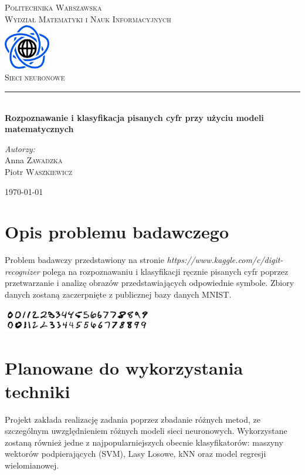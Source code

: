 \documentclass{article}
\begin{document}
\begin{titlepage}
\newcommand{\HRule}{\rule{\linewidth}{0.5mm}}
\begin{center}
\textsc{\LARGE Politechnika Warszawska}\\[0.5cm]
\textsc{\Large Wydział Matematyki i Nauk Informacyjnych}\\[1cm]
\includegraphics[width=2cm, height=2cm]{logo}\\[1cm]
\textsc{\Huge Sieci neuronowe}\\[0.5cm]
\HRule \\[0.4cm]
{ \LARGE \bfseries Rozpoznawanie i klasyfikacja pisanych cyfr przy użyciu modeli matematycznych}\\[4cm]
\begin{flushright}
\Large \emph{Autorzy:}\\[0.5cm]
Anna \textsc{Zawadzka}\\
Piotr \textsc{Waszkiewicz}\\[2.5cm]
\end{flushright} 
\vfill
{\large \today}\\[1cm]	
\end{center}
\end{titlepage}

\newpage
\section{Opis problemu badawczego}
Problem badawczy przedstawiony na stronie \textit{https://www.kaggle.com/c/digit-recognizer} polega na rozpoznawaniu i klasyfikacji ręcznie pisanych cyfr poprzez przetwarzanie i analizę obrazów przedstawiających odpowiednie symbole. Zbiory danych zostaną zaczerpnięte z publicznej bazy danych  MNIST\cite{mnist_database}. 
\begin{center}
\includegraphics[width=0.49\textwidth]{native}
\end{center}

\section{Planowane do wykorzystania techniki}
Projekt zakłada realizację zadania poprzez zbadanie różnych metod, ze szczególnym uwzględnieniem różnych modeli sieci neuronowych. Wykorzystane zostaną również jedne z najpopularniejszych obecnie klasyfikatorów: maszyny wektorów podpierających (SVM), Lasy Losowe, kNN oraz model regresji wielomianowej. \\
\end{document}
